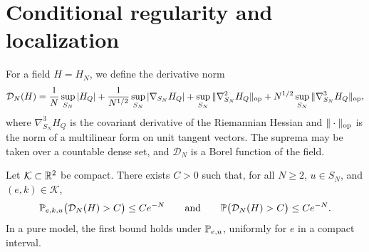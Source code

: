 \section{Conditional regularity and localization}\label{sec:mo-localization}

For a field $H=H_N$, we define the derivative norm
\begin{equation}\label{eq:mo-regnorm}
\mathcal D_N(H)=\frac1N\sup_{S_N}|H_Q|+\frac1{N^{1/2}}\sup_{S_N}|\nabla_{S_N}H_Q|+\sup_{S_N}\|\nabla_{S_N}^2H_Q\|_{\rm op}+N^{1/2}\sup_{S_N}\|\nabla_{S_N}^3H_Q\|_{\rm op},
\end{equation}
where $\nabla_{S_N}^3H_Q$ is the covariant derivative of the Riemannian Hessian and $\|\cdot\|_{\rm op}$ is the norm of a multilinear form on unit tangent vectors. The suprema may be taken over a countable dense set, and $\mathcal D_N$ is a Borel function of the field.

\begin{lemma}\label{lem:mo-regularity}
Let $\mathcal K\subset\mathbb R^2$ be compact. There exists $C>0$ such that, for all $N\ge2$, $u\in S_N$, and $(e,k)\in\mathcal K$,
\begin{equation}\label{eq:mo-regularity}
\mathbb P_{e,k,u}\bigl(\mathcal D_N(H)>C\bigr)\le Ce^{-N}\qquad\text{and}\qquad\mathbb P\bigl(\mathcal D_N(H)>C\bigr)\le Ce^{-N}.
\end{equation}
In a pure model, the first bound holds under $\mathbb P_{e,u}$, uniformly for $e$ in a compact interval.
\end{lemma}

